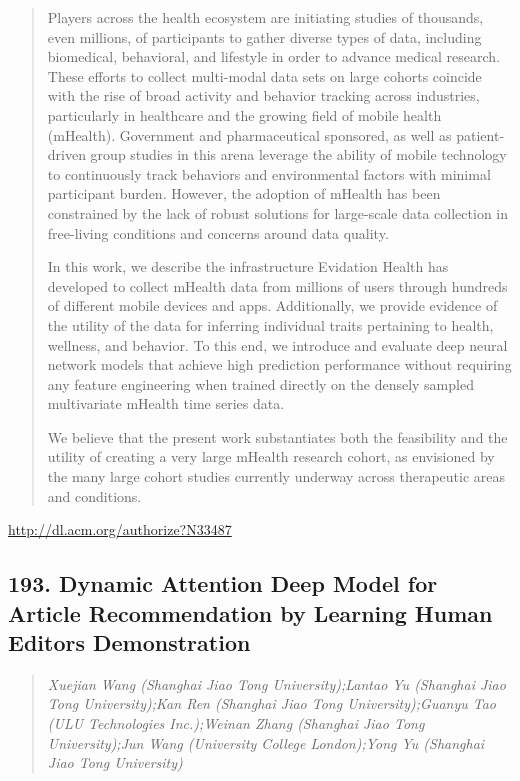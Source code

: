 \documentclass{article}
\begin{document}
\begin{quote}
Players across the health ecosystem are initiating studies of thousands, even millions, of participants to gather diverse types of data, including biomedical, behavioral, and lifestyle in order to advance medical research. These efforts to collect multi-modal data sets on large cohorts coincide with the rise of broad activity and behavior tracking across industries, particularly in healthcare and the growing field of mobile health (mHealth). Government and pharmaceutical sponsored, as well as patient-driven group studies in this arena leverage the ability of mobile technology to continuously track behaviors and environmental factors with minimal participant burden. However, the adoption of mHealth has been constrained by the lack of robust solutions for large-scale data collection in free-living conditions and concerns around data quality.







  In this work, we describe the infrastructure Evidation Health has developed to collect mHealth data from millions of users through hundreds of different mobile devices and apps. Additionally, we provide evidence of the utility of the data for inferring individual traits pertaining to health, wellness, and behavior. To this end, we introduce and evaluate deep neural network models that achieve high prediction performance without requiring any feature engineering when trained directly on the densely sampled multivariate mHealth time series data. 







  We believe that the present work substantiates both the feasibility and the utility of creating a very large mHealth research cohort, as envisioned by the many large cohort studies currently underway across therapeutic areas and conditions.
\end{quote}

\href{http://dl.acm.org/authorize?N33487}{http://dl.acm.org/authorize?N33487}

\subsection{193. Dynamic Attention Deep Model for Article Recommendation by Learning Human Editors Demonstration}

\begin{quote}
\footnotesize{\textit{Xuejian Wang (Shanghai Jiao Tong University);Lantao Yu (Shanghai Jiao Tong University);Kan Ren (Shanghai Jiao Tong University);Guanyu Tao (ULU Technologies Inc.);Weinan Zhang (Shanghai Jiao Tong University);Jun Wang (University College London);Yong Yu (Shanghai Jiao Tong University)}}

\end{quote}
\end{document}
